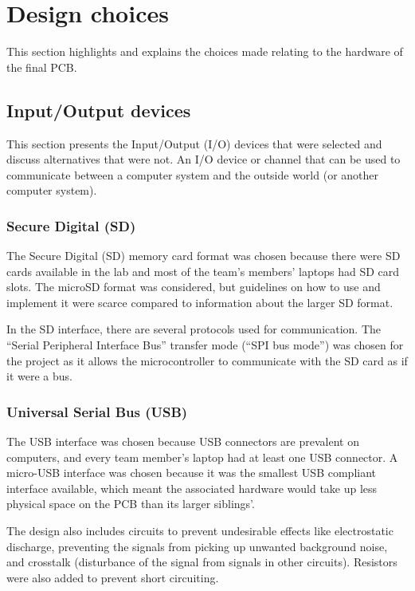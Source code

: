 \section {Design choices}
This section highlights and explains the choices made relating to the hardware of the final PCB.

\subsection{Input/Output devices} \label{pcb:design-choices:ss:IO_devices}
This section presents the Input/Output (I/O) devices that were selected and discuss alternatives that were not.
An I/O device or channel that can be used to communicate between a computer system and the outside world (or another computer system).

\subsubsection{Secure Digital (SD)} 
The Secure Digital (SD) memory card format was chosen because there were SD cards available in the lab and most of the team's members' laptops had SD card slots.
The microSD format was considered, but guidelines on how to use and implement it were scarce compared to information about the larger SD format.

In the SD interface, there are several protocols used for communication. 
The ``Serial Peripheral Interface Bus'' transfer mode (``SPI bus mode'') was chosen for the project as it allows the microcontroller to communicate with the SD card as if it were a bus.


\subsubsection{Universal Serial Bus (USB)}
The USB interface was chosen because USB connectors are prevalent on computers, and every team member's laptop had at least one USB connector.
A micro-USB interface was chosen because it was the smallest USB compliant interface available, which meant the associated hardware would take up less physical space on the PCB than its larger siblings'.

The design also includes circuits to prevent undesirable effects like electrostatic discharge, preventing the signals from picking up unwanted background noise, and crosstalk (disturbance of the signal from signals in other circuits).
Resistors were also added to prevent short circuiting.

